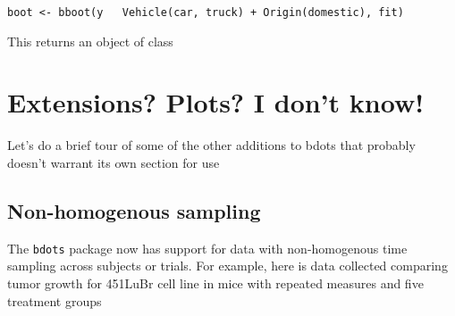 \documentclass{article}
\begin{document}
\begin{center}
\tt boot <- bboot(y ~ Vehicle(car, truck) + Origin(domestic), fit)
\end{center}

This returns an object of class 






\section{Extensions? Plots? I don't know!}

Let's do a brief tour of some of the other additions to bdots that probably doesn't warrant its own section for use

\subsection{Non-homogenous sampling}

The \texttt{bdots} package now has support for data with non-homogenous time sampling across subjects or trials. For example, here is data collected comparing tumor growth for 451LuBr cell line in mice with repeated measures and five treatment groups
\end{document}
